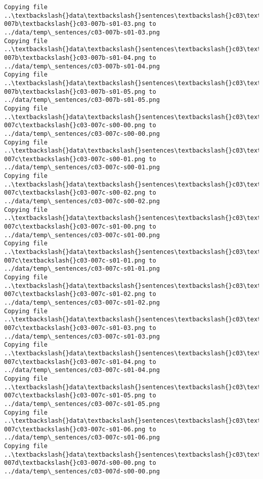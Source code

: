\documentclass[11pt]{article}
\begin{document}
\begin{Verbatim}[commandchars=\\\{\}]
Copying file ..\textbackslash{}data\textbackslash{}sentences\textbackslash{}c03\textbackslash{}c03-007b\textbackslash{}c03-007b-s01-03.png to
../data/temp\_sentences/c03-007b-s01-03.png
Copying file ..\textbackslash{}data\textbackslash{}sentences\textbackslash{}c03\textbackslash{}c03-007b\textbackslash{}c03-007b-s01-04.png to
../data/temp\_sentences/c03-007b-s01-04.png
Copying file ..\textbackslash{}data\textbackslash{}sentences\textbackslash{}c03\textbackslash{}c03-007b\textbackslash{}c03-007b-s01-05.png to
../data/temp\_sentences/c03-007b-s01-05.png
Copying file ..\textbackslash{}data\textbackslash{}sentences\textbackslash{}c03\textbackslash{}c03-007c\textbackslash{}c03-007c-s00-00.png to
../data/temp\_sentences/c03-007c-s00-00.png
Copying file ..\textbackslash{}data\textbackslash{}sentences\textbackslash{}c03\textbackslash{}c03-007c\textbackslash{}c03-007c-s00-01.png to
../data/temp\_sentences/c03-007c-s00-01.png
Copying file ..\textbackslash{}data\textbackslash{}sentences\textbackslash{}c03\textbackslash{}c03-007c\textbackslash{}c03-007c-s00-02.png to
../data/temp\_sentences/c03-007c-s00-02.png
Copying file ..\textbackslash{}data\textbackslash{}sentences\textbackslash{}c03\textbackslash{}c03-007c\textbackslash{}c03-007c-s01-00.png to
../data/temp\_sentences/c03-007c-s01-00.png
Copying file ..\textbackslash{}data\textbackslash{}sentences\textbackslash{}c03\textbackslash{}c03-007c\textbackslash{}c03-007c-s01-01.png to
../data/temp\_sentences/c03-007c-s01-01.png
Copying file ..\textbackslash{}data\textbackslash{}sentences\textbackslash{}c03\textbackslash{}c03-007c\textbackslash{}c03-007c-s01-02.png to
../data/temp\_sentences/c03-007c-s01-02.png
Copying file ..\textbackslash{}data\textbackslash{}sentences\textbackslash{}c03\textbackslash{}c03-007c\textbackslash{}c03-007c-s01-03.png to
../data/temp\_sentences/c03-007c-s01-03.png
Copying file ..\textbackslash{}data\textbackslash{}sentences\textbackslash{}c03\textbackslash{}c03-007c\textbackslash{}c03-007c-s01-04.png to
../data/temp\_sentences/c03-007c-s01-04.png
Copying file ..\textbackslash{}data\textbackslash{}sentences\textbackslash{}c03\textbackslash{}c03-007c\textbackslash{}c03-007c-s01-05.png to
../data/temp\_sentences/c03-007c-s01-05.png
Copying file ..\textbackslash{}data\textbackslash{}sentences\textbackslash{}c03\textbackslash{}c03-007c\textbackslash{}c03-007c-s01-06.png to
../data/temp\_sentences/c03-007c-s01-06.png
Copying file ..\textbackslash{}data\textbackslash{}sentences\textbackslash{}c03\textbackslash{}c03-007d\textbackslash{}c03-007d-s00-00.png to
../data/temp\_sentences/c03-007d-s00-00.png

\end{Verbatim}
\end{document}
